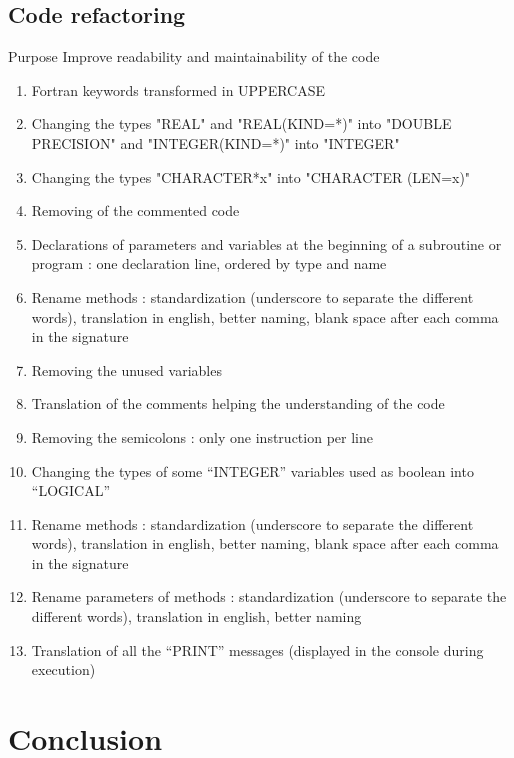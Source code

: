 \documentclass[10p]{beamer}
\begin{document}
\subsection{Code refactoring}
\begin{frame}[allowframebreaks]
\begin{block}{Purpose}
Improve readability and maintainability of the code
\end{block}
\begin{enumerate}
\item Fortran keywords transformed in UPPERCASE
\item Changing the types "REAL" and "REAL(KIND=*)" into "DOUBLE PRECISION" and "INTEGER(KIND=*)" into "INTEGER"
\item Changing the types "CHARACTER*x" into "CHARACTER (LEN=x)"
\item Removing of the commented code
\item Declarations of parameters and variables at the beginning of a subroutine or program : one declaration line, ordered by type and name
\item Rename methods : standardization (underscore to separate the different words), translation in english, better naming, blank space after each comma in the signature
\item Removing the unused variables
\item Translation of the comments helping the understanding of the code
\item Removing the semicolons : only one instruction per line
\item Changing the types of some “INTEGER” variables used as boolean into “LOGICAL”
\item Rename methods : standardization (underscore to separate the different words), translation in english, better naming, blank space after each comma in the signature
\item Rename parameters of methods : standardization (underscore to separate the different words), translation in english, better naming
\item Translation of all the “PRINT” messages (displayed in the console during execution)
\end{enumerate}
\end{frame}
\section{Conclusion}
\begin{frame}

\end{frame}
\end{document}
